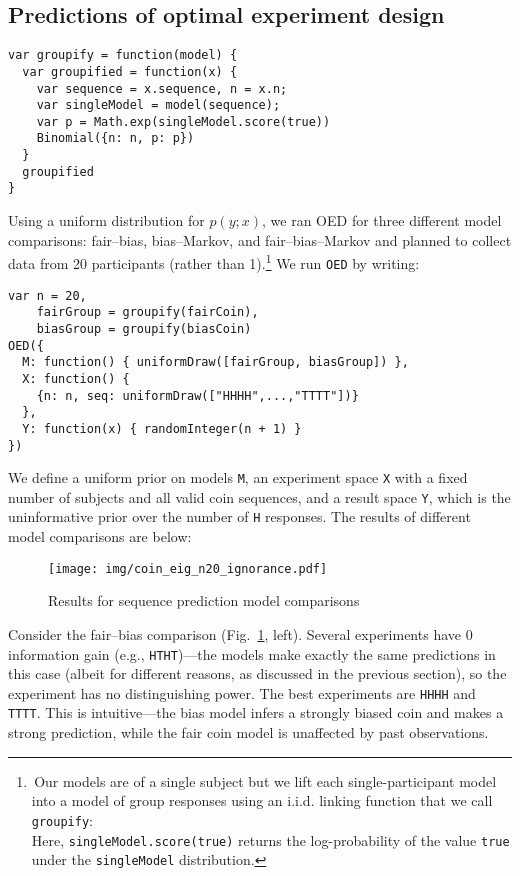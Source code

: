\documentclass[10pt,letterpaper]{article}
\begin{document}
\subsection{Predictions of optimal experiment design}

\newsavebox{\LstBox}

\begin{lrbox}{\LstBox}
\begin{lstlisting}
var groupify = function(model) {
  var groupified = function(x) {
    var sequence = x.sequence, n = x.n;
    var singleModel = model(sequence);
    var p = Math.exp(singleModel.score(true))
    Binomial({n: n, p: p})
  }
  groupified
}
\end{lstlisting}
\end{lrbox}

Using a uniform distribution for $p(y; x)$, we ran OED for three different model comparisons: fair--bias, bias--Markov, and fair--bias--Markov and planned to collect data from 20 participants (rather than 1).\footnote{\,Our models are of a single subject but we lift each single-participant model into a model of group responses using an i.i.d. linking function that we call \texttt{groupify}:
\usebox{\LstBox}\\
Here, \texttt{singleModel.score(true)} returns the log-probability of the value \texttt{true} under the \texttt{singleModel} distribution.}
We run \texttt{OED} by writing:
\begin{lstlisting}
var n = 20,
    fairGroup = groupify(fairCoin),
    biasGroup = groupify(biasCoin)
OED({
  M: function() { uniformDraw([fairGroup, biasGroup]) },
  X: function() {
    {n: n, seq: uniformDraw(["HHHH",...,"TTTT"])}
  },
  Y: function(x) { randomInteger(n + 1) }
})
\end{lstlisting}
We define a uniform prior on models \texttt{M}, an experiment space \texttt{X} with a fixed number of subjects and all valid coin sequences, and a result space \texttt{Y}, which is the uninformative prior over the number of \texttt{H} responses.
The results of different model comparisons are below:

\begin{figure}[h]
 \texttt{[image: img/coin\_eig\_n20\_ignorance.pdf]}
  \caption{Results for sequence prediction model comparisons}
  \label{fig:run-coin}
\end{figure}

Consider the fair--bias comparison (Fig.~\ref{fig:run-coin}, left).
Several experiments have 0 information gain (e.g., \lstinline{HTHT})---the models make exactly the same predictions in this case (albeit for different reasons, as discussed in the previous section), so the experiment has no distinguishing power.
The best experiments are \lstinline{HHHH} and \lstinline{TTTT}.
This is intuitive---the bias model infers a strongly biased coin and makes a strong prediction, while the fair coin model is unaffected by past observations.
\end{document}
